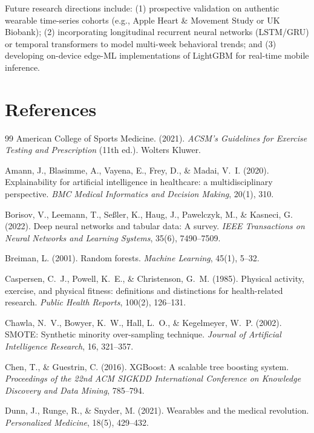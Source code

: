 \documentclass[11pt,a4paper]{article}
\begin{document}
Future research directions include: (1) prospective validation on authentic wearable time-series cohorts (e.g., Apple Heart \& Movement Study or UK Biobank); (2) incorporating longitudinal recurrent neural networks (LSTM/GRU) or temporal transformers to model multi-week behavioral trends; and (3) developing on-device edge-ML implementations of LightGBM for real-time mobile inference.

\section{References}
\begin{thebibliography}{99}
American College of Sports Medicine. (2021). \emph{ACSM's Guidelines for Exercise Testing and Prescription} (11th ed.). Wolters Kluwer.

Amann, J., Blasimme, A., Vayena, E., Frey, D., \& Madai, V.~I. (2020). Explainability for artificial intelligence in healthcare: a multidisciplinary perspective. \emph{BMC Medical Informatics and Decision Making}, 20(1), 310.

Borisov, V., Leemann, T., Se{\ss}ler, K., Haug, J., Pawelczyk, M., \& Kasneci, G. (2022). Deep neural networks and tabular data: A survey. \emph{IEEE Transactions on Neural Networks and Learning Systems}, 35(6), 7490--7509.

Breiman, L. (2001). Random forests. \emph{Machine Learning}, 45(1), 5--32.

Caspersen, C.~J., Powell, K.~E., \& Christenson, G.~M. (1985). Physical activity, exercise, and physical fitness: definitions and distinctions for health-related research. \emph{Public Health Reports}, 100(2), 126--131.

Chawla, N.~V., Bowyer, K.~W., Hall, L.~O., \& Kegelmeyer, W.~P. (2002). SMOTE: Synthetic minority over-sampling technique. \emph{Journal of Artificial Intelligence Research}, 16, 321--357.

Chen, T., \& Guestrin, C. (2016). XGBoost: A scalable tree boosting system. \emph{Proceedings of the 22nd ACM SIGKDD International Conference on Knowledge Discovery and Data Mining}, 785--794.

Dunn, J., Runge, R., \& Snyder, M. (2021). Wearables and the medical revolution. \emph{Personalized Medicine}, 18(5), 429--432.


\end{thebibliography}
\end{document}
